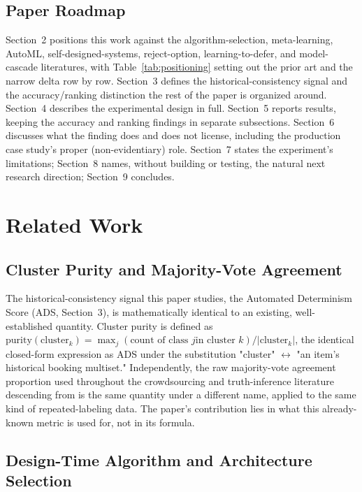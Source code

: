 \documentclass[11pt]{article}
\begin{document}
\subsection{Paper Roadmap}
\label{sec:roadmap}

Section~2 positions this work against the algorithm-selection, meta-learning,
AutoML, self-designed-systems, reject-option, learning-to-defer, and model-
cascade literatures, with Table~\ref{tab:positioning} setting out the prior
art and the narrow delta row by row. Section~3 defines the
historical-consistency signal and
the accuracy/ranking distinction the rest of the paper is organized around.
Section~4 describes the experimental design in full. Section~5 reports
results, keeping the accuracy and ranking findings in separate subsections.
Section~6 discusses what the finding does and does not license, including the
production case study's proper (non-evidentiary) role. Section~7 states the
experiment's limitations; Section~8 names, without building or testing, the
natural next research direction; Section~9 concludes.

\section{Related Work}
\label{sec:related-work}

\subsection{Cluster Purity and Majority-Vote Agreement}
\label{sec:cluster-purity}

The historical-consistency signal this paper studies, the Automated
Determinism Score (ADS, Section~3), is mathematically identical to an
existing, well-established quantity. Cluster purity
\citep{manning2008,amigo2009} is defined as
$\mathrm{purity}(\mathrm{cluster}_k) = \max_j(\text{count of class }j\text{
in cluster }k) / |\mathrm{cluster}_k|$, the identical closed-form
expression as ADS under the substitution "cluster" $\leftrightarrow$ "an
item's historical booking multiset." Independently, the raw majority-vote
agreement proportion used throughout the crowdsourcing and truth-inference
literature descending from \citet{dawidskene1979} is the same quantity under
a different name, applied to the same kind of repeated-labeling data. The
paper's contribution lies in what this already-known metric is used for, not
in its formula.

\subsection{Design-Time Algorithm and Architecture Selection}
\label{sec:design-time-selection}
\end{document}
